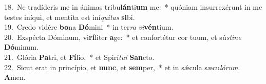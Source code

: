 {18.~}Ne tradíderis me in ánimas tribu\textbf{lán}ti\textbf{um} me:~* quóniam insurrexérunt in me testes iníqui, et mentíta est iní\textit{qui}\textit{tas} \textbf{si}bi.\\
{19.~}Credo vidére \textbf{bo}na \textbf{Dó}mini~* in ter\textit{ra} \textit{vi}\textbf{vén}tium.\\
{20.~}Exspécta Dóminum, vi\textbf{rí}liter \textbf{a}ge:~* et confortétur cor tuum, et sú\textit{sti}\textit{ne} \textbf{Dó}minum.\\
{21.~}Glória \textbf{Pa}tri, et \textbf{Fí}lio,~* et Spirí\textit{tu}\textit{i} \textbf{San}cto.\\
{22.~}Sicut erat in princípio, et \textbf{nunc}, et \textbf{sem}per,~* et in sǽcula sæcu\textit{ló}\textit{rum}. \textbf{A}men.\\
